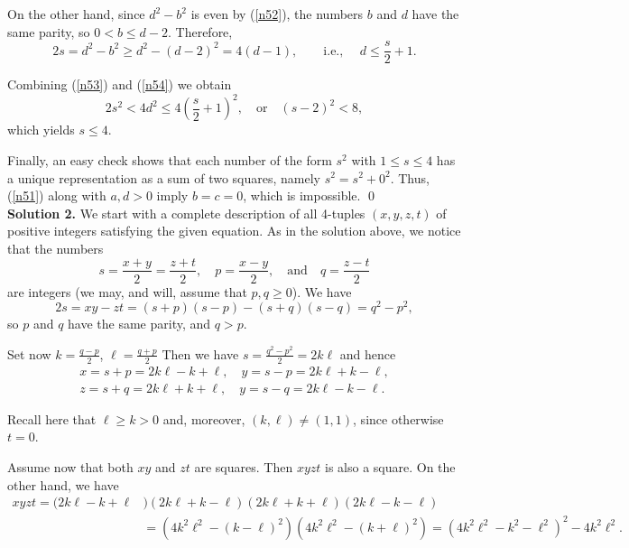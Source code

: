 \documentclass[a4paper, 12pt]{article}
\begin{document}
\begin{enumerate}
On the other hand, since $d^2 - b^2$ is even by (\ref{n52}), the numbers $b$ and $d$ have the same parity, so $0 < b \leq d-2$. Therefore,
\begin{equation} \label{n54}
2s = d^2 - b^2 \geq d^2 - (d-2)^2 = 4(d-1), \qquad \textrm{i.e., } \quad d \leq \frac{s}{2} + 1.
\end{equation}

Combining (\ref{n53}) and (\ref{n54}) we obtain
$$
2s^2 < 4d^2 \leq 4 \left(  \frac{s}{2} + 1 \right)^2, \quad \textrm{or} \quad (s-2)^2 < 8,
$$
which yields $s \leq 4$.

Finally, an easy check shows that each number of the form $s^2$ with $1 \leq s \leq 4$ has a unique representation as a sum of two squares, namely $s^2 = s^2 + 0^2$. Thus, (\ref{n51}) along with $a, d > 0$ imply $b = c = 0$, which is impossible. \qed \\

\textbf{Solution 2. } We start with a complete description of all 4-tuples $(x, y, z, t)$ of positive integers satisfying the given equation.  As in the solution above, we notice that the numbers
$$
s = \frac{x+y}{2} = \frac{z+t}{2}, \quad p = \frac{x-y}{2}, \quad \textrm{and} \quad q = \frac{z-t}{2}
$$
are integers (we may, and will, assume that $p, q \geq 0$). We have
$$
2s = xy - zt = (s+p)(s-p) - (s+q)(s-q) = q^2 - p^2,
$$
so $p$ and $q$ have the same parity, and $q > p$.

Set now $k = \frac{q-p}{2}$, $\ell = \frac{q+p}{2}$ Then we have $s = \frac{q^2 - p^2}{2} = 2 k \ell$ and hence
\begin{align}
    x = s+p = 2k\ell - k + \ell, \quad y = s-p = 2k\ell + k - \ell, \label{n55a}\\
    z = s+q = 2k\ell + k + \ell, \quad y = s-q = 2k\ell - k - \ell. \label{n55b}
\end{align}

Recall here that $\ell \geq k > 0$ and, moreover, $(k, \ell) \not = (1, 1)$, since otherwise $t = 0$.

Assume now that both $xy$ and $zt$ are squares. Then $xyzt$ is also a square. On the other hand, we have
\begin{align}
    xyzt = (2 k \ell - k + \ell &)(2k\ell + k -\ell)(2k \ell + k + \ell)(2k \ell - k - \ell) \nonumber \\
    &= (4 k^2 \ell^2 - (k - \ell)^2)(4k^2 \ell^2 - (k + \ell)^2 ) = (4k^2 \ell^2 - k^2 - \ell^2)^2 - 4k^2 \ell^2.  \label{n56}
\end{align}


\end{enumerate}
\end{document}

